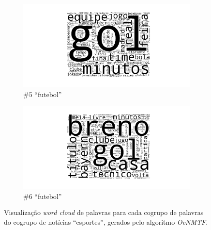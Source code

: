 \documentclass[
    12pt,                %
    oneside,            %
    a4paper,            %
    english,            %
    brazil                %
    ]{abntex2ppgsi}
\begin{document}
\begin{figure}[H]
\centering
    \begin{subfigure}[b]{0.45\textwidth}
        \includegraphics[width=\textwidth]{img/ovnmtf-nc-3-tc-1.png}
        \caption{\#5 ``futebol''}
    \end{subfigure}
    \begin{subfigure}[b]{0.45\textwidth}
        \includegraphics[width=\textwidth]{img/ovnmtf-nc-3-tc-2.png}
        \caption{\#6 ``futebol''}
    \end{subfigure}

    \caption{Visualização \textit{word cloud} de palavras para cada cogrupo de palavras do cogrupo de notícias ``esportes'', gerados pelo algoritmo \textit{OvNMTF}.}
    \label{fig:ovnmtf:wordcloud-3}
\end{figure}






\end{document}
